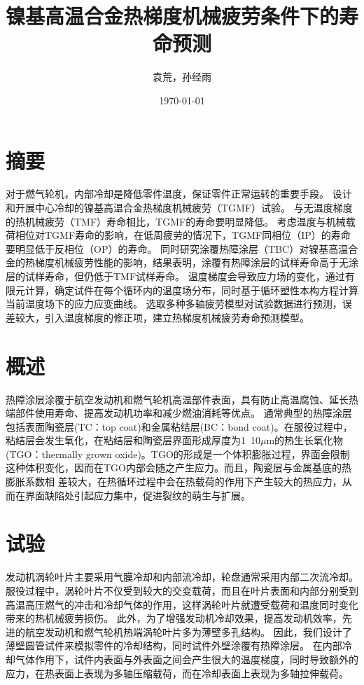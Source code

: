 \documentclass{article}
\begin{document}
\title{镍基高温合金热梯度机械疲劳条件下的寿命预测}

\author{袁荒，孙经雨}
\date{\today}
\maketitle
\tableofcontents

\section*{摘要}
对于燃气轮机，内部冷却是降低零件温度，保证零件正常运转的重要手段。
设计和开展中心冷却的镍基高温合金热梯度机械疲劳（TGMF）试验。
与无温度梯度的热机械疲劳（TMF）寿命相比，TGMF的寿命要明显降低。
考虑温度与机械载荷相位对TGMF寿命的影响，在低周疲劳的情况下，TGMF同相位（IP）的寿命要明显低于反相位（OP）的寿命。
同时研究涂覆热障涂层（TBC）对镍基高温合金的热梯度机械疲劳性能的影响，结果表明，涂覆有热障涂层的试样寿命高于无涂层的试样寿命，但仍低于TMF试样寿命。
温度梯度会导致应力场的变化，通过有限元计算，确定试件在每个循环内的温度场分布，同时基于循环塑性本构方程计算当前温度场下的应力应变曲线。
选取多种多轴疲劳模型对试验数据进行预测，误差较大，引入温度梯度的修正项，建立热梯度机械疲劳寿命预测模型。

\section{概述}
热障涂层涂覆于航空发动机和燃气轮机高温部件表面，具有防止高温腐蚀、延长热端部件使用寿命、提高发动机功率和减少燃油消耗等优点。
通常典型的热障涂层包括表面陶瓷层(TC：top coat)和金属粘结层(BC：bond coat)。在服役过程中，粘结层会发生氧化，在粘结层和陶瓷层界面形成厚度为1~10$\mu$m的热生长氧化物(TGO：thermally grown oxide)。TGO的形成是一个体积膨胀过程，界面会限制这种体积变化，因而在TGO内部会随之产生应力。而且，陶瓷层与金属基底的热膨胀系数相
差较大，在热循环过程中会在热载荷的作用下产生较大的热应力，从而在界面缺陷处引起应力集中，促进裂纹的萌生与扩展。
\section{试验}

发动机涡轮叶片主要采用气膜冷却和内部流冷却，轮盘通常采用内部二次流冷却。
服役过程中，涡轮叶片不仅受到较大的交变载荷，而且在叶片表面和内部分别受到高温高压燃气的冲击和冷却气体的作用，这样涡轮叶片就遭受载荷和温度同时变化带来的热机械疲劳损伤。
此外，为了增强发动机冷却效果，提高发动机效率，先进的航空发动机和燃气轮机热端涡轮叶片多为薄壁多孔结构。
因此，我们设计了薄壁圆管试件来模拟零件的冷却结构，同时试件外壁涂覆有热障涂层。
在内部冷却气体作用下，试件内表面与外表面之间会产生很大的温度梯度，同时导致额外的应力，在热表面上表现为多轴压缩载荷，而在冷却表面上表现为多轴拉伸载荷。
\end{document}

